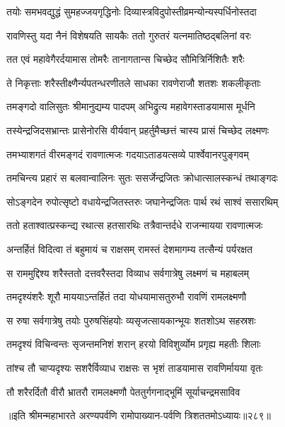 \twolineshloka
{तयोः समभवद्युद्धं सुमहज्जयगृद्धिनोः}
{दिव्यास्त्रविदुपोस्तीव्रमन्योन्यस्पर्धिनोस्तदा}


\twolineshloka
{रावणिस्तु यदा नैनं विशेषयति सायकैः}
{ततो गुरुतरं यत्नमातिष्ठद्बलिनां वरः}


\twolineshloka
{तत एवं महावेगैरर्दयामास तोमरैः}
{तानागतान्स चिच्छेद सौमित्रिर्निशितैः शरैः}


\twolineshloka
{ते निकृत्ताः शरैस्तीक्ष्णैर्न्यपतन्धरणीतले}
{साधका रावणेराजौ शतशः शकलीकृताः}


\twolineshloka
{तमङ्गदो वालिसुतः श्रीमानुद्यम्य पादपम्}
{अभिद्रुत्य महावेगस्ताडयामास मूर्धनि}


\twolineshloka
{तस्येन्द्रजिदसभ्रान्तः प्रासेनोरसि वीर्यवान्}
{प्रहर्तुमैच्छत्तं चास्य प्रासं चिच्छेद लक्ष्मणः}


\twolineshloka
{तमभ्याशगतं वीरमङ्गदं रावणात्मजः}
{गदयाऽताडयत्सव्ये पार्श्वेवानरपुङ्गवम्}


\twolineshloka
{तमचिन्त्य प्रहारं स बलवान्वालिनः सुतः}
{ससर्जेन्द्रजितः क्रोधात्सालस्कन्धं तथाङ्गदः}


\twolineshloka
{सोऽङ्गदेन रुपोत्सृष्टो वधायेन्द्रजितस्तरुः}
{जघानेन्द्रजितः पार्थ रथं साश्वं ससारथिम्}


\twolineshloka
{ततो हताश्वात्प्रस्कन्द्य रथात्स हतसारथिः}
{तत्रैवान्तर्दधे राजन्मायया रावणात्मजः}


\twolineshloka
{अन्तर्हितं विदित्वा तं बहुमायं च राक्षसम्}
{रामस्तं देशमागम्य तत्सैन्यं पर्यरक्षत}


\twolineshloka
{स राममुद्दिश्य शरैस्ततो दत्तवरैस्तदा}
{विव्याध सर्वगात्रेषु लक्ष्मणं च महाबलम्}


\twolineshloka
{तमदृश्यंशरैः शूरौ माययाऽन्तर्हितं तदा}
{योधयामासतुरुभौ रावणिं रामलक्ष्मणौ}


\twolineshloka
{स रुषा सर्वगात्रेषु तयोः पुरुषसिंहयोः}
{व्यसृजत्सायकान्भूयः शतशोऽथ सहस्रशः}


\twolineshloka
{तमदृश्यं विचिन्वन्तः सृजन्तमनिशं शरान्}
{हरयो विविशुर्व्योम प्रगृह्य महतीः शिलाः}


\twolineshloka
{तांश्च तौ चाप्यदृश्यः सशरैर्विव्याध राक्षसः}
{स भृशं ताडयामास रावणिर्मायया वृतः}


\twolineshloka
{तौ शरैरर्दितौ वीरौ भ्रातरौ रामलक्ष्मणौ}
{पेततुर्गगनाद्भूमिं सूर्याचन्द्रमसाविव}


॥इति श्रीमन्महाभारते अरण्यपर्वणि रामोपाख्यान-पर्वणि त्रिशततमोऽध्यायः॥२८९॥

\storymeta

\resetShloka



